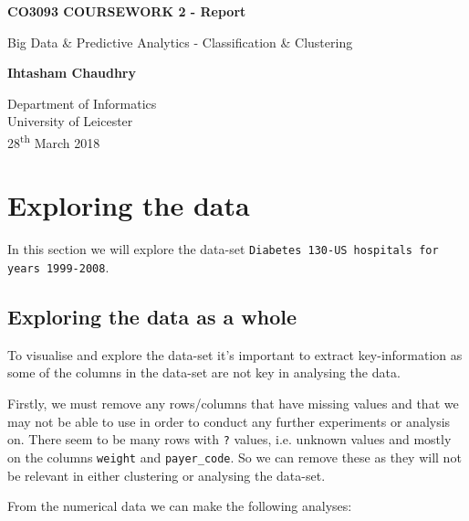 \documentclass[11pt]{report}
\newcommand{\ts}{\textsuperscript}
\newcommand{\linespace}{\vspace{0.3cm}\noindent}
\begin{document}
\begin{titlepage}
    \begin{center}
        \vspace*{1cm}
        
        \textbf{CO3093 COURSEWORK 2 - Report}
        
        \vspace{0.5cm}
		Big Data \& Predictive Analytics - Classification \& Clustering
        
        \vspace{1.5cm}
        
        \textbf{Ihtasham Chaudhry}
        
        \vfill
        
        \vspace{0.8cm}
                
        Department of Informatics\\
        University of Leicester\\
        28\ts{th} March 2018
        
    \end{center}
\end{titlepage}

\newpage

\section{Exploring the data}

\linespace
In this section we will explore the data-set \texttt{Diabetes 130-US hospitals for years 1999-2008}. 

\subsection{Exploring the data as a whole}

To visualise and explore the data-set it's important to extract key-information as some of the columns in the data-set are not key in analysing the data.

\linespace
Firstly, we must remove any rows/columns that have missing values and that we may not be able to use in order to conduct any further experiments or analysis on. There seem to be many rows with \texttt{?} values, i.e. unknown values and mostly on the columns \texttt{weight} and \texttt{payer\_code}. So we can remove these as they will not be relevant in either clustering or analysing the data-set.

\linespace
From the numerical data we can make the following analyses:
\end{document}
